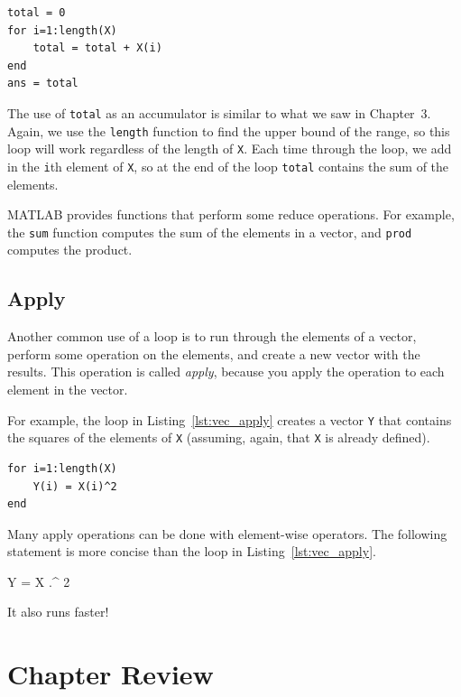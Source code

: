 \begin{lstlisting}[caption={Reducing a vector to a single scalar value (the sum)}, label={lst:vec_reduce}]
total = 0
for i=1:length(X)
    total = total + X(i)
end
ans = total
\end{lstlisting}

The use of \lstinline{total} as an accumulator is similar to what we
saw in Chapter~3.  Again, we use the \lstinline{length} function
to find the upper bound of the range, so this loop will work
regardless of the length of \lstinline{X}.
Each time through the loop, we add
in the \lstinline{i}th element of \lstinline{X}, so at the end of the loop
\lstinline{total} contains the sum of the elements.


MATLAB provides functions that perform some reduce operations.
For example, the \lstinline{sum} function computes the sum of the elements
in a vector, and \lstinline{prod} computes the product.


\subsection{Apply}
\label{apply}

Another common use of a loop is to run through the elements of
a vector, perform some operation on the elements, and create
a new vector with the results.  This operation is called
\emph{apply}, because you apply the operation to each element in
the vector.


For example, the loop in Listing~\ref{lst:vec_apply} creates a vector \lstinline{Y} that
contains the squares of the elements of \lstinline{X} (assuming, again, that \lstinline{X} is already defined).

\begin{lstlisting}[caption={Making a new vector Y by squaring the elements in X}, label={lst:vec_apply}]
for i=1:length(X)
    Y(i) = X(i)^2
end
\end{lstlisting}

Many apply operations can be done with element-wise operators.
The following statement is more concise than the loop in
Listing~\ref{lst:vec_apply}.
\newpage
\begin{code}
Y = X .^ 2
\end{code}

It also runs faster!


\section{Chapter Review}

